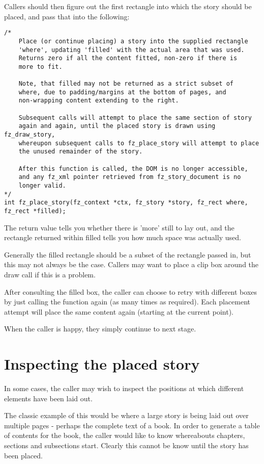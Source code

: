 \documentclass[oneside]{book}
\begin{document}
Callers should then figure out the first rectangle into which the story should be placed, and pass that into the following:

\begin{lstlisting}
/*
	Place (or continue placing) a story into the supplied rectangle
	'where', updating 'filled' with the actual area that was used.
	Returns zero if all the content fitted, non-zero if there is
	more to fit.

	Note, that filled may not be returned as a strict subset of
	where, due to padding/margins at the bottom of pages, and
	non-wrapping content extending to the right.

	Subsequent calls will attempt to place the same section of story
	again and again, until the placed story is drawn using fz_draw_story,
	whereupon subsequent calls to fz_place_story will attempt to place
	the unused remainder of the story.

	After this function is called, the DOM is no longer accessible,
	and any fz_xml pointer retrieved from fz_story_document is no
	longer valid.
*/
int fz_place_story(fz_context *ctx, fz_story *story, fz_rect where, fz_rect *filled);
\end{lstlisting}

The return value tells you whether there is 'more' still to lay out, and the rectangle returned within filled tells you how much space was actually used.

Generally the filled rectangle should be a subset of the rectangle passed in, but this may not always be the case. Callers may want to place a clip box around the draw call if this is a problem.

After consulting the filled box, the caller can choose to retry with different boxes by just calling the function again (as many times as required). Each placement attempt will place the same content again (starting at the current point).

When the caller is happy, they simply continue to next stage.

\section{Inspecting the placed story}

In some cases, the caller may wish to inspect the positions at which different elements have been laid out.

The classic example of this would be where a large story is being laid out over multiple pages - perhaps the complete text of a book. In order to generate a table of contents for the book, the caller would like to know whereabouts chapters, sections and subsections start. Clearly this cannot be know until the story has been placed.
\end{document}
